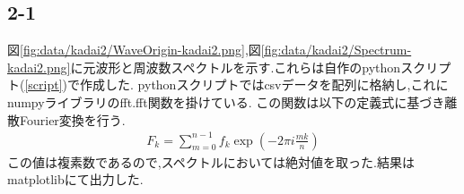 \subsection*{2-1}
図\ref{fig:data/kadai2/WaveOrigin-kadai2.png},図\ref{fig:data/kadai2/Spectrum-kadai2.png}に元波形と周波数スペクトルを示す.これらは自作のpythonスクリプト(\ref{script})で作成した.
pythonスクリプトではcsvデータを配列に格納し,これにnumpyライブラリのfft.fft関数を掛けている.
この関数は以下の定義式に基づき離散Fourier変換を行う.\cite{Discrete33:online}
\begin{align*}
  F_k=\sum_{m=0}^{n-1}f_k\exp\left(-2\pi i\frac{mk}{n}\right)
\end{align*}
この値は複素数であるので,スペクトルにおいては絶対値を取った.結果はmatplotlibにて出力した.
